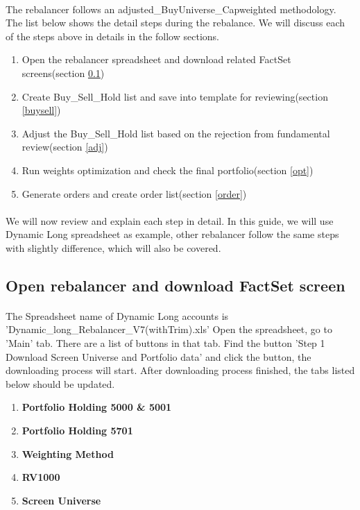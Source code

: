\documentclass[12pt,letterpaper,twoside]{article}
\begin{document}
\paragraph{}The rebalancer follows an adjusted\_BuyUniverse\_Capweighted methodology. The list below shows the detail steps during the rebalance. We will discuss each of the steps above in details in the follow sections.
\begin{enumerate}
  \item Open the rebalancer spreadsheet and download related FactSet screens(section \ref{download})
  \item Create Buy\_Sell\_Hold list and save into template for reviewing(section \ref{buysell})
  \item Adjust the Buy\_Sell\_Hold list based on the rejection from fundamental review(section \ref{adj})
  \item Run weights optimization and check the final portfolio(section \ref{opt})
  \item Generate orders and create order list(section \ref{order})
\end{enumerate}

\paragraph{}We will now review and explain each step in detail. In this guide, we will use Dynamic Long spreadsheet as example, other rebalancer follow the same steps with slightly difference, which will also be covered. 

\subsection{Open rebalancer and download FactSet screen}\label{download}
\paragraph{}The Spreadsheet name of Dynamic Long accounts is 'Dynamic\_long\_Rebalancer\_V7(withTrim).xls' Open the spreadsheet, go to 'Main' tab. There are a list of buttons in that tab. Find the button 'Step 1 Download Screen Universe and Portfolio data' and click the button, the downloading process will start. After downloading process finished, the tabs listed below should be updated.
\begin{enumerate}
\item \textbf{Portfolio Holding 5000 \& 5001}
\item \textbf{Portfolio Holding 5701}
\item \textbf{Weighting Method}
\item \textbf{RV1000}
\item \textbf{Screen Universe}
\end{enumerate}
\end{document}
